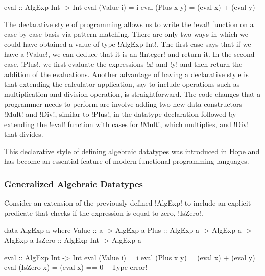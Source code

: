 \documentclass[manuscript,screen,nonacm]{acmart}
\begin{document}
\begin{CenteredBox}
\begin{code}
eval :: AlgExp Int -> Int
eval (Value i)  = i
eval (Plus x y) = (eval x) + (eval y)
\end{code}
\end{CenteredBox}

The declarative style of programming allows us to write the !eval! function on a case by case basis via pattern matching. There are only two ways in which we could have obtained a value of type !AlgExp Int!. The first case says that if we have a !Value!, we can deduce that it is an !Integer! and return it. In the second case, !Plus!, we first evaluate the expressions !x! and !y! and then return the addition of the evaluations. Another advantage of having a declarative style is that extending the calculator application, say to include operations such as multiplication and division operation, is straightforward. The code changes that a programmer needs to perform are involve adding two new data constructors !Mult! and !Div!, similar to !Plus!, in the datatype declaration followed by extending the !eval! function with cases for !Mult!, which multiplies, and !Div! that divides.

This declarative style of defining algebraic datatypes was introduced in Hope\cite{burstall_hope_1980} and has become an essential feature of modern functional programming languages.

\subsubsection{Generalized Algebraic Datatypes}
Consider an extension of the previously defined !AlgExp! to include an explicit predicate that checks if the expression is equal to zero, !IsZero!.

\begin{minipage}[ht]{0.6\linewidth}
\begin{code}
data AlgExp a where
    Value  ::  a                    -> AlgExp a
    Plus   ::  AlgExp a -> AlgExp a -> AlgExp a
    IsZero ::  AlgExp Int           -> AlgExp a
\end{code}
\end{minipage}%
\begin{minipage}[ht]{0.4\linewidth}
\begin{code}
eval :: AlgExp Int -> Int
eval (Value i)  = i
eval (Plus x y) = (eval x) + (eval y)
eval (IsZero x) = (eval x) == 0 -- Type error!
\end{code}
\end{minipage}
\end{document}
